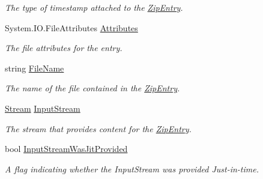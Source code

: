 \begin{DoxyCompactItemize}
\begin{DoxyCompactList}\small\item\em The type of timestamp attached to the \mbox{\hyperlink{class_super_tiled2_unity_1_1_ionic_1_1_zip_1_1_zip_entry}{Zip\+Entry}}. \end{DoxyCompactList}\item 
System.\+I\+O.\+File\+Attributes \mbox{\hyperlink{class_super_tiled2_unity_1_1_ionic_1_1_zip_1_1_zip_entry_a65bea4a1790f224d1be99cd8d51be425}{Attributes}}
\begin{DoxyCompactList}\small\item\em The file attributes for the entry. \end{DoxyCompactList}\item 
string \mbox{\hyperlink{class_super_tiled2_unity_1_1_ionic_1_1_zip_1_1_zip_entry_a78e0c5ee8272a51926eabb9ffc1b38d9}{File\+Name}}
\begin{DoxyCompactList}\small\item\em The name of the file contained in the \mbox{\hyperlink{class_super_tiled2_unity_1_1_ionic_1_1_zip_1_1_zip_entry}{Zip\+Entry}}. \end{DoxyCompactList}\item 
\mbox{\hyperlink{namespace_super_tiled2_unity_1_1_ionic_1_1_zip_a9ced5352c56e7e0fceff15b534073c83aeae835e83c0494a376229f254f7d3392}{Stream}} \mbox{\hyperlink{class_super_tiled2_unity_1_1_ionic_1_1_zip_1_1_zip_entry_a9c5db72a0ee3dad46be934c75ffcfe91}{Input\+Stream}}
\begin{DoxyCompactList}\small\item\em The stream that provides content for the \mbox{\hyperlink{class_super_tiled2_unity_1_1_ionic_1_1_zip_1_1_zip_entry}{Zip\+Entry}}. \end{DoxyCompactList}\item 
bool \mbox{\hyperlink{class_super_tiled2_unity_1_1_ionic_1_1_zip_1_1_zip_entry_a621c95b01079d1bdc1fa2a3ade52676f}{Input\+Stream\+Was\+Jit\+Provided}}
\begin{DoxyCompactList}\small\item\em A flag indicating whether the Input\+Stream was provided Just-\/in-\/time. \end{DoxyCompactList}\item 

\end{DoxyCompactItemize}
